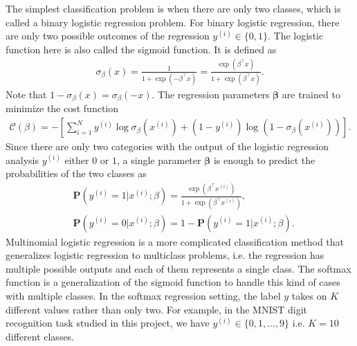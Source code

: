 \documentclass[a4paper]{article}
\begin{document}
The simplest classification problem is when there are only two classes, which is called a binary logistic regression problem. For binary logistic regression, there are only two possible outcomes of the regression $y^{(i)} \in \{0, 1\}$. The logistic function here is also called the sigmoid function. It is defined as
\begin{align}
    \sigma_\beta(x) 
    = \frac{1}{1+\mathrm \exp{(-{\beta}^{\top} x)}}
    = \frac {\exp{({\beta}^{\top} x)}}{1+\mathrm \exp{({\beta}^{\top} x)}}.
\end{align}
Note that $1-\sigma_\beta(x)= \sigma_\beta(-x)$. The regression parameters $\boldsymbol{\beta}$ are trained to minimize the cost function \cite{softmax}
\begin{align}
    \mathcal{C}(\beta) = -\left[ \sum_{i=1}^N y^{(i)} \log \sigma_\beta(x^{(i)}) + (1-y^{(i)}) \log (1-\sigma_\beta(x^{(i)})) \right].
\end{align}
Since there are only two categories with the output of the logistic regression analysis $y^{(i)}$ either $0$ or $1$, a single parameter $\boldsymbol{\beta}$ is enough to predict the probabilities of the two classes as
\begin{align}
    &\mathbf{P}(y^{(i)}=1|x^{(i)};{\beta}) 
    = \frac{\exp{(\beta^{\top} x^{(i)})}}{1+ \exp{(\beta^{\top} x^{(i)})}},\nonumber\\
    &\mathbf{P}(y^{(i)}=0|x^{(i)};{\beta}) 
    = 1 - \mathbf{P}(y^{(i)}=1|x^{(i)};{\beta}) .
\end{align} 
Multinomial logistic regression is a more complicated classification method that generalizes logistic regression to multiclass problems, i.e. the regression has multiple possible outputs and each of them represents a single class. The softmax function is a generalization of the sigmoid function to handle this kind of cases with multiple classes. In the softmax regression setting, the label $y$ takes on $K$ different values rather than only two. For example, in the MNIST digit recognition task studied in this project, we have $y^{(i)} \in \{0, 1, \ldots, 9\}$ i.e. $K=10$ different classes.
\end{document}
